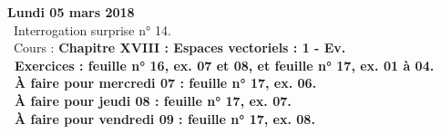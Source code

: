 \documentclass[12pt,a4paper]{article}
\begin{document}
% 
% 
% 
% 
% 
% 
% 
% 

\noindent\textbf{\bf Lundi 05 mars 2018} \\
\bu\ Interrogation surprise n° 14.\\
\bu\ Cours : \bf Chapitre XVIII \rm : Espaces vectoriels : 1 - Ev.\\
\bu\ Exercices : feuille n° 16, ex. 07 et 08, et feuille n° 17, ex. 01 à 04.\\
\bu\ À faire pour mercredi 07 : feuille n° 17, ex. 06.\\
\bu\ À faire pour jeudi 08 : feuille n° 17, ex. 07.\\
\bu\ À faire pour vendredi 09 : feuille n° 17, ex. 08.\vspace{.4cm}\\
\end{document}

